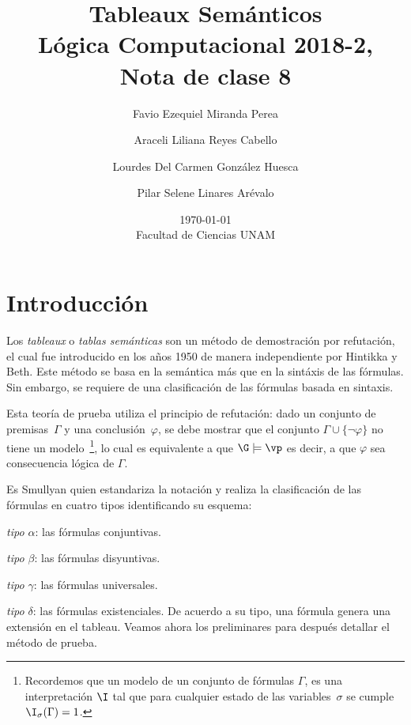 \documentclass[11pt,letterpaper]{article}
\title{Tableaux Sem\'anticos \\ 
L\'ogica Computacional 2018-2, Nota de clase 8}
\author{Favio Ezequiel Miranda Perea\and Araceli Liliana Reyes Cabello\and
Lourdes Del Carmen Gonz\'alez Huesca \and Pilar Selene Linares Ar\'evalo}
\date{\today\\ Facultad de Ciencias UNAM}
\begin{document}
\maketitle

\section{Introducción}
Los \emph{tableaux} o \emph{tablas semánticas} son un método de
demostración por refutación, el cual fue introducido en los años 1950 
de manera independiente por Hintikka y Beth. 
Este método se basa en la semántica más que en la sintáxis de las fórmulas. Sin
embargo, se requiere de una clasificación de las fórmulas basada en sintaxis.

Esta teor\'ia de prueba utiliza el principio de refutación: dado un 
conjunto de premisas~$\Gamma$ y una conclusión~$\varphi$, se debe mostrar que el
conjunto $\Gamma\cup \{ \lnot \varphi \}$ no tiene un 
modelo~\footnote{Recordemos que un modelo de un conjunto de fórmulas $\Gamma$, 
es una interpretación $\I$ tal que para cualquier estado de las 
variables~$\sigma$ se cumple $\I_\sigma(\Gamma)=1$.},
lo cual es equivalente a que $\G\models\vp$ es decir, a que
$\varphi$ sea consecuencia lógica de $\Gamma$.

Es Smullyan quien estandariza la notación y realiza la clasificación de las
fórmulas en cuatro tipos identificando su esquema:
\bi
\item \emph{tipo $\alpha$}: las fórmulas conjuntivas.
\item \emph{tipo $\beta$}: las fórmulas disyuntivas.
\item \emph{tipo $\gamma$}: las fórmulas universales.
\item \emph{tipo $\delta$}: las f\'ormulas existenciales.
\ei
De acuerdo a su tipo, una fórmula genera una extensión en el tableau. 
Veamos ahora los preliminares para despu\'es detallar el método de prueba.

\end{document}
